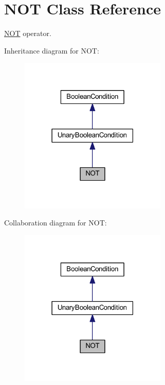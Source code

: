 \hypertarget{class_n_o_t}{\section{N\-O\-T Class Reference}
\label{class_n_o_t}
}


\hyperlink{class_n_o_t}{N\-O\-T} operator.  




Inheritance diagram for N\-O\-T\-:\nopagebreak
\begin{figure}[H]
\begin{center}
\leavevmode
\includegraphics[width=198pt]{class_n_o_t__inherit__graph}
\end{center}
\end{figure}


Collaboration diagram for N\-O\-T\-:\nopagebreak
\begin{figure}[H]
\begin{center}
\leavevmode
\includegraphics[width=198pt]{class_n_o_t__coll__graph}
\end{center}
\end{figure}
